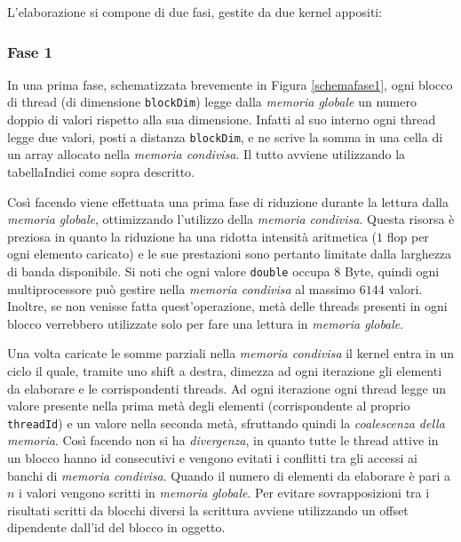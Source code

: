 \documentclass[a4paper]{article}   %
\begin{document}
L’elaborazione si compone di due fasi, gestite da due kernel appositi:
\subsubsection{Fase 1}
In una prima fase, schematizzata brevemente in Figura \ref{schemafase1}, ogni blocco di thread (di dimensione {\tt blockDim}) legge dalla \emph{memoria globale} un numero doppio di valori rispetto alla sua dimensione. Infatti al suo interno ogni thread legge due valori, posti a distanza {\tt blockDim}, e ne scrive la somma in una cella di un array allocato nella \emph{memoria condivisa}. Il tutto avviene utilizzando la tabellaIndici come sopra descritto.

Così facendo viene effettuata una prima fase di riduzione durante la lettura dalla \emph{memoria globale}, ottimizzando l’utilizzo della \emph{memoria condivisa}. Questa risorsa è preziosa in quanto la riduzione ha una ridotta intensità aritmetica ($1$ flop per ogni elemento caricato) e le sue prestazioni sono pertanto limitate dalla larghezza di banda disponibile. Si noti che ogni valore {\tt double} occupa $8$ Byte, quindi ogni multiprocessore può gestire nella \emph{memoria condivisa} al massimo $6144$ valori.
Inoltre, se non venisse fatta quest’operazione, metà delle threads presenti in ogni blocco verrebbero utilizzate solo per fare una lettura in \emph{memoria globale}. 

Una volta caricate le somme parziali nella \emph{memoria condivisa} il kernel entra in un ciclo il quale, tramite uno shift a destra, dimezza ad ogni iterazione gli elementi da elaborare e le corrispondenti threads.
Ad ogni iterazione ogni thread legge un valore presente nella prima metà degli elementi (corrispondente al proprio {\tt threadId}) e un valore nella seconda metà, sfruttando quindi la \emph{coalescenza della memoria}. Così facendo non si ha \emph{divergenza}, in quanto tutte le thread attive in un blocco hanno id consecutivi e vengono evitati i conflitti tra gli accessi ai banchi di \emph{memoria condivisa}.
Quando il numero di elementi da elaborare è pari a $n$ i valori vengono scritti in \emph{memoria globale}. Per evitare sovrapposizioni tra i risultati scritti da blocchi diversi la scrittura avviene utilizzando un offset dipendente dall’id del blocco in oggetto.
\end{document}
